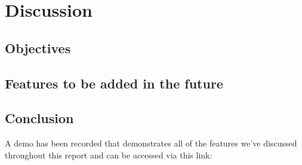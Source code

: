\chapter{Discussion}
\label{chapter4}

\section{Objectives}

\section{Features to be added in the future}
\label{futureDevelopment}

\section{Conclusion}
\label{Conclusion}

A demo has been recorded that demonstrates all of the features we've discussed throughout this report and can be accessed via this link:

\begin{center}
    \url{}
\end{center}